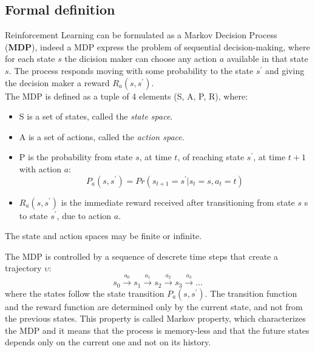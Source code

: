 \documentclass[14pt]{extarticle}
\def\sp{\vspace{5pt}}
\def\ppn{\vspace{10pt}}
\begin{document}
\begin{flushleft}
\subsection{Formal definition}
\sp
Reinforcement Learning can be formulated as a Markov Decision Process (\textbf{MDP}), indeed a MDP express the problem of sequential decision-making, where for each state $s$ the dicision maker can choose any action $a$ available in that state $s$. The process responds moving with some probability to the state $s^\prime$ and giving the decision maker a reward $R_a(s,s^\prime)$. %
\\
The MDP is defined as a tuple of 4 elements (S, A, P, R), where:
\begin{itemize}
\item S is a set of states, called the \emph{state space}.
\item A is a set of actions, called the \emph{action space}.
\item P is the probability from state $s$, at time $t$, of reaching state $s^\prime$, at time $t+1$ with action $a$:
\[P_a(s,s^\prime) = Pr(s_{t+1} = s^\prime | s_t = s, a_t = t)\]
\item $R_a(s,s^\prime)$ is the immediate reward received after transitioning from state $s$ s to state $s^\prime$, due to action $a$.
\end{itemize}
The state and action spaces may be finite or infinite.

\ppn
The MDP is controlled by a sequence of descrete time steps that create a trajectory $\upsilon$:
\[s_0 \xrightarrow{a_0} s_1 \xrightarrow{a_1} s_2 \xrightarrow{a_2} s_3 \xrightarrow{a_3} \dotso\]
where the states follow the state transition $P_a(s,s^\prime)$. The transition function and the reward function are determined only by the current state, and not from the previous states. This property is called Markov property, which characterizes the MDP and it means that the process is memory-less and that the future states depends only on the current one and not on its history.


\end{flushleft}
\end{document}
